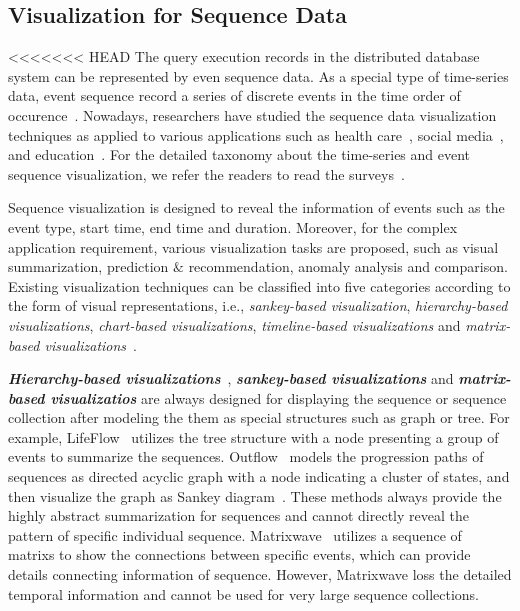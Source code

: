 \subsection{Visualization for Sequence Data}
<<<<<<< HEAD
The query execution records in the distributed database system can be represented by even sequence data.
As a special type of time-series data, event sequence record a series of discrete events in the time order of occurence~\cite{guo2020survey}. 
Nowadays, researchers have studied the sequence data visualization techniques as applied to various applications such as health care~\cite{malik2015cohort, wongsuphasawat2011outflow}, social media~\cite{zhao2014fluxflow, law2018maqui}, and education~\cite{chen2015peakvizor, mu2019moocad, goulden2019ccvis, he2019vuc, chen2018viseq}.
For the detailed taxonomy about the time-series and event sequence visualization, we refer the readers to read the surveys~\cite{guo2020survey, silva2000visualization}. 


Sequence visualization is designed to reveal the information of events such as the event type, start time, end time and duration. Moreover, for the complex application requirement, various visualization tasks are proposed, such as visual summarization, prediction $\&$ recommendation, anomaly analysis and comparison. Existing visualization techniques can be classified into five categories according to the form of visual representations, i.e., \emph{sankey-based visualization}, \emph{hierarchy-based visualizations}, \emph{chart-based visualizations}, \emph{timeline-based visualizations} and \emph{matrix-based visualizations}~\cite{guo2020survey}. 

\emph{\textbf{Hierarchy-based visualizations}}~\cite{gotz2019visual}, \emph{\textbf{sankey-based visualizations}} and \emph{\textbf{matrix-based visualizatios}} are always designed for displaying the sequence or sequence collection after modeling the them as special structures such as graph or tree.
For example, LifeFlow~\cite{wongsuphasawat2011lifeflow} utilizes the tree structure with a node presenting a group of events to summarize the sequences. Outflow~\cite{wongsuphasawat2011outflow} models the progression paths of sequences as directed acyclic graph with a node indicating a cluster of states, and then visualize the graph as Sankey diagram~\cite{riehmann2005interactive}.  These methods always provide the highly abstract summarization for sequences and cannot directly reveal the pattern of specific individual sequence. Matrixwave~\cite{zhao2015matrixwave} utilizes a sequence of matrixs to show the connections between specific events, which can provide details connecting information of sequence. However, Matrixwave loss the detailed temporal information and cannot be used for very large sequence collections. 

